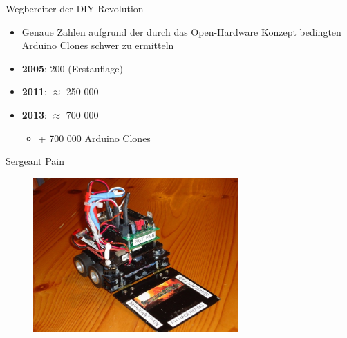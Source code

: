 \documentclass{beamer}
\begin{document}
\begin{frame}{Wegbereiter der DIY-Revolution}
\begin{itemize}
	\item Genaue Zahlen aufgrund der durch das Open-Hardware Konzept bedingten Arduino Clones schwer zu ermitteln
\end{itemize}
\vspace{10px}
\begin{itemize}
	\item \textbf{2005}: 200 (Erstauflage)\cite{IEEE:2016:TheMakingOfArduino}
\end{itemize}
\begin{itemize}
	\item \textbf{2011}: $\approx$ 250 000\cite{IEEE:2016:TheMakingOfArduino}
\end{itemize}
\begin{itemize}
	\item \textbf{2013}: $\approx$ 700 000\cite{Quora:ArduinoSalesNumbers}
	\begin{itemize}
		\item + 700 000 Arduino Clones
	\end{itemize}
\end{itemize}
\end{frame}
\begin{frame}{Sergeant Pain}
 \begin{figure}[H]
  \centering
  \includegraphics[width=0.7\textwidth]{./images/robot-sergeant-pain.jpg}
 \end{figure}
\end{frame}
\end{document}
